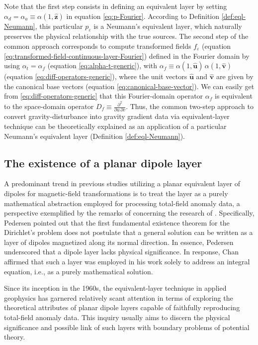 Note that the first step consists in defining an equivalent layer 
by setting $\alpha_{d} = \alpha_{a} \equiv \alpha(1, \hat{\mathbf{z}})$ in equation \ref{eq:p-Fourier}.
According to Definition \ref{def:eql-Neumann}, this particular $p_{\varepsilon}$ is a Neumann's equivalent layer,
which naturally preserves the physical relationship with the true sources.
The second step of the common approach corresponds to 
compute transformed fields $f_{\varepsilon}$ (equation \ref{eq:transformed-field-continuous-layer-Fourier}) 
defined in the Fourier domain by using $\alpha_{t} = \alpha_{f}$ (equation \ref{eq:alpha-t-generic}), with 
$\alpha_{f} \equiv \alpha(1, \hat{\mathbf{u}}) \, \alpha(1, \hat{\mathbf{v}})$ (equation \ref{eq:diff-operators-generic}), 
where the unit vectors $\hat{\mathbf{u}}$ and $\hat{\mathbf{v}}$ are given by the canonical base vectors (equation \ref{eq:canonical-base-vector}).
We can easily get from \ref{eq:diff-operators-generic} that this Fourier-domain operator $\alpha_{f}$ is equivalent to the 
space-domain operator $D_{f} \equiv \tfrac{\partial^{2}}{\partial u \, \partial v}$.
Thus, the common two-step approach to convert gravity-disturbance into gravity
gradient data via equivalent-layer technique can be theoretically explained as an application of 
a particular Neumann's equivalent layer (Definition \ref{def:eql-Neumann}).


\subsection{The existence of a planar dipole layer}


A predominant trend in previous studies utilizing a planar equivalent layer of dipoles for magnetic-field transformations 
is to treat the layer as a purely mathematical abstraction employed for processing total-field anomaly data, 
a perspective exemplified by the remarks of \citet{pedersen1989} concerning the research of 
\citet{bhattacharyya_chan1977}.
Specifically, Pedersen pointed out that the first fundamental existence theorem for the Dirichlet's 
problem does not postulate that a general solution can be written as a layer of dipoles magnetized along its 
normal direction. In essence, Pedersen underscored that a dipole layer lacks physical significance.
In response, Chan affirmed that such a layer was employed in his work 
solely to address an integral equation, i.e., as a purely mathematical solution.

Since its inception in the 1960s, the equivalent-layer technique in applied geophysics has garnered 
relatively scant attention in terms of exploring the theoretical attributes of planar dipole layers 
capable of faithfully reproducing total-field anomaly data. 
This inquiry usually aims to discern the physical significance and possible link of such layers 
with boundary problems of potential theory.

